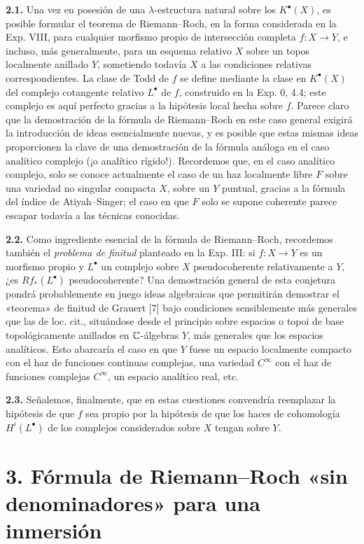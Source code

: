 \textbf{2.1.} Una vez en posesión de una $\lambda$-estructura natural sobre
los $K^\bullet(X)$, es posible formular el teorema de
Riemann--Roch, en la forma considerada en la Exp. VIII, para cualquier
morfismo propio de intersección completa $f:X\to Y$, e incluso, más
generalmente, para un esquema relativo $X$ sobre un topos localmente
anillado $Y$, sometiendo todavía $X$ a las condiciones relativas
correspondientes. La clase de Todd de $f$ se define mediante la clase en
$K^\bullet(X)$ del complejo cotangente relativo $L^\bullet$ de $f$,
construido en la Exp. 0, 4.4; este complejo es aquí perfecto gracias a la
hipótesis local hecha sobre $f$. Parece claro que la demostración de la
fórmula de Riemann--Roch en este caso general exigirá la introducción de
ideas esencialmente nuevas, y es posible que estas mismas ideas proporcionen
la clave de una demostración de la fórmula análoga en el caso analítico
complejo (¡o analítico rígido!). Recordemos que, en el caso analítico
complejo, solo se conoce actualmente el caso de un haz localmente libre $F$
sobre una variedad no singular compacta $X$, sobre un $Y$ puntual, gracias
a la fórmula del índice de Atiyah--Singer; el caso en que $F$ solo se supone
coherente parece escapar todavía a las técnicas conocidas.

\textbf{2.2.} Como ingrediente esencial de la fórmula de Riemann--Roch,
recordemos también el \emph{problema de finitud} planteado en la Exp. III:
si $f:X\to Y$ es un morfismo propio y $L^\bullet$ un complejo sobre $X$
pseudocoherente relativamente a $Y$, ¿es $Rf_*(L^\bullet)$
pseudocoherente? Una demostración general de esta conjetura pondrá
probablemente en juego ideas algebraicas que permitirán demostrar el
«teorema» de finitud de Grauert [7] bajo condiciones sensiblemente más
generales que las de loc. cit., situándose desde el principio sobre espacios
o topoi de base topológicamente anillados en $\mathbb C$-álgebras $Y$, más generales
que los espacios analíticos. Esto abarcaría el caso en que $Y$ fuese un
espacio localmente compacto con el haz de funciones continuas complejas, una
variedad $C^\infty$ con el haz de funciones complejas $C^\infty$, un espacio
analítico real, etc.

\textbf{2.3.} Señalemos, finalmente, que en estas cuestiones convendría
reemplazar la hipótesis de que $f$ sea propio por la hipótesis de que los
haces de cohomología $H^i(L^\bullet)$ de los complejos considerados sobre
$X$ tengan  sobre $Y$.

\section*{3. Fórmula de Riemann--Roch «sin denominadores» para una inmersión}

